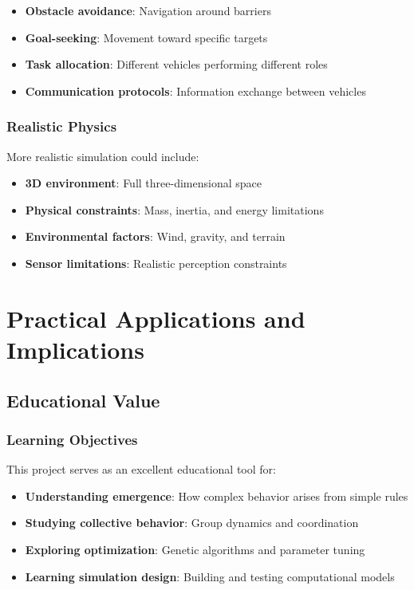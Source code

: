 \documentclass[12pt,a4paper]{article}
\begin{document}
\begin{itemize}
    \item \textbf{Obstacle avoidance}: Navigation around barriers
    \item \textbf{Goal-seeking}: Movement toward specific targets
    \item \textbf{Task allocation}: Different vehicles performing different roles
    \item \textbf{Communication protocols}: Information exchange between vehicles
\end{itemize}

\subsubsection{Realistic Physics}
More realistic simulation could include:

\begin{itemize}
    \item \textbf{3D environment}: Full three-dimensional space
    \item \textbf{Physical constraints}: Mass, inertia, and energy limitations
    \item \textbf{Environmental factors}: Wind, gravity, and terrain
    \item \textbf{Sensor limitations}: Realistic perception constraints
\end{itemize}

\section{Practical Applications and Implications}

\subsection{Educational Value}

\subsubsection{Learning Objectives}
This project serves as an excellent educational tool for:

\begin{itemize}
    \item \textbf{Understanding emergence}: How complex behavior arises from simple rules
    \item \textbf{Studying collective behavior}: Group dynamics and coordination
    \item \textbf{Exploring optimization}: Genetic algorithms and parameter tuning
    \item \textbf{Learning simulation design}: Building and testing computational models
\end{itemize}
\end{document}
